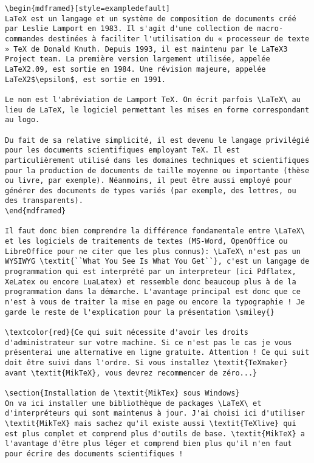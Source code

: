 \documentclass[11pt,a4paper]{article} %
\begin{document}
\begin{Verbatim}[breaklines=true]
\begin{mdframed}[style=exampledefault]
LaTeX est un langage et un système de composition de documents créé par Leslie Lamport en 1983. Il s'agit d'une collection de macro-commandes destinées à faciliter l'utilisation du « processeur de texte » TeX de Donald Knuth. Depuis 1993, il est maintenu par le LaTeX3 Project team. La première version largement utilisée, appelée LaTeX2.09, est sortie en 1984. Une révision majeure, appelée LaTeX2$\epsilon$, est sortie en 1991.

Le nom est l'abréviation de Lamport TeX. On écrit parfois \LaTeX\ au lieu de LaTeX, le logiciel permettant les mises en forme correspondant au logo.

Du fait de sa relative simplicité, il est devenu le langage privilégié pour les documents scientifiques employant TeX. Il est particulièrement utilisé dans les domaines techniques et scientifiques pour la production de documents de taille moyenne ou importante (thèse ou livre, par exemple). Néanmoins, il peut être aussi employé pour générer des documents de types variés (par exemple, des lettres, ou des transparents).
\end{mdframed}

Il faut donc bien comprendre la différence fondamentale entre \LaTeX\ et les logiciels de traitements de textes (MS-Word, OpenOffice ou LibreOffice pour ne citer que les plus connus): \LaTeX\ n'est pas un WYSIWYG \textit{``What You See Is What You Get``}, c'est un langage de programmation qui est interprété par un interpreteur (ici Pdflatex, XeLatex ou encore LuaLatex) et ressemble donc beaucoup plus à de la programmation dans la démarche. L'avantage principal est donc que ce n'est à vous de traiter la mise en page ou encore la typographie ! Je garde le reste de l'explication pour la présentation \smiley{}

\textcolor{red}{Ce qui suit nécessite d'avoir les droits d'administrateur sur votre machine. Si ce n'est pas le cas je vous présenterai une alternative en ligne gratuite. Attention ! Ce qui suit doit être suivi dans l'ordre. Si vous installez \textit{TeXmaker} avant \textit{MikTeX}, vous devrez recommencer de zéro...}

\section{Installation de \textit{MikTex} sous Windows}
On va ici installer une bibliothèque de packages \LaTeX\ et d'interpréteurs qui sont maintenus à jour. J'ai choisi ici d'utiliser \textit{MikTeX} mais sachez qu'il existe aussi \textit{TeXlive} qui est plus complet et comprend plus d'outils de base. \textit{MikTeX} a l'avantage d'être plus léger et comprend bien plus qu'il n'en faut pour écrire des documents scientifiques !


\end{Verbatim}
\end{document}
